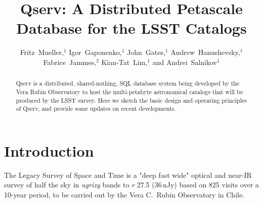 \documentclass[11pt,twoside]{article}
\begin{document}

\title{Qserv: A Distributed Petascale Database for the LSST Catalogs}

\author{Fritz~Mueller,$^1$ Igor~Gaponenko,$^1$ John~Gates,$^1$ Andrew~Hanushevsky,$^1$ Fabrice~Jammes,$^2$ Kian-Tat~Lim,$^1$ and Andrei~Salnikov$^1$}

\begin{abstract}
Qserv is a distributed, shared-nothing, SQL database system being developed by the Vera Rubin Observatory to
host the multi-petabyte astronomical catalogs that will be produced by the LSST survey.  Here we sketch the
basic design and operating principles of Qserv, and provide some updates on recent developments.
\end{abstract}

\section{Introduction}

The Legacy Survey of Space and Time \citep{2019ApJ...873..111I} is a "deep fast wide" optical and near-IR
survey of half the sky in \emph{ugrizy} bands to \emph{r} 27.5 (36\,nJy) based on 825 visits over a 10-year
period, to be carried out by the Vera C.\ Rubin Observatory in Chile.
\end{document}
